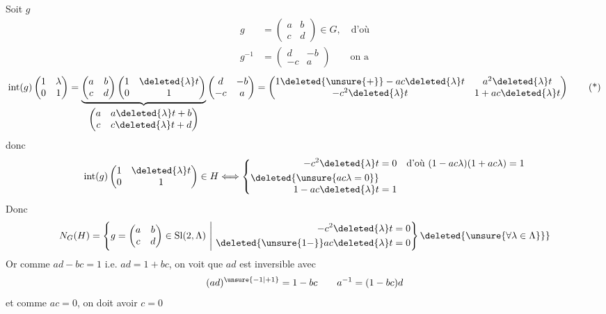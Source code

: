 Soit $g$
\[
\begin{aligned}
g&=\begin{pmatrix}a&b\\c&d\end{pmatrix}\in G,\quad\text{d'où}\\
g^{-1}&=\begin{pmatrix}d&-b\\-c&a\end{pmatrix}\qquad\text{on a}
\end{aligned}
\]
\[
\operatorname{int}(g)\begin{pmatrix}1&\lambda\\0&1\end{pmatrix}=
\underbrace{\begin{pmatrix}a&b\\c&d\end{pmatrix}\begin{pmatrix}1&\deleted{\lambda}t\\0&1\end{pmatrix}}_{\begin{pmatrix}a&a\deleted{\lambda}t+b\\c&c\deleted{\lambda}t+d\end{pmatrix}}
\begin{pmatrix}d&-b\\-c&a\end{pmatrix}=
\begin{pmatrix}1\deleted{\unsure{+}}-ac\deleted{\lambda}t&a^2\deleted{\lambda}t\\-c^2\deleted{\lambda}t&1+ac\deleted{\lambda}t\end{pmatrix}\tag*{(*)}
\]
donc
\[
\operatorname{int}(g)\begin{pmatrix}1&\deleted{\lambda}t\\0&1\end{pmatrix}\in H
\Longleftrightarrow\left\{\begin{aligned}
-c^2\deleted{\lambda}t&=0\quad\text{d'où }(1-ac\lambda)(1+ac\lambda)=1\\
\deleted{\unsure{ac\lambda=0}}\\[-3pt]
1-ac\deleted{\lambda}t&=1
\end{aligned}\right.
\]
Donc
\[
N_G(H)=\left\{g=\begin{pmatrix}a&b\\c&d\end{pmatrix}\in\mathrm{Sl}(2,\Lambda)\ \middle|\ 
\begin{aligned}-c^2\deleted{\lambda}t&=0\\
\deleted{\unsure{1-}}ac\deleted{\lambda}t&=0\end{aligned}\right\}
\deleted{\unsure{\forall\lambda\in\Lambda\}}}
\]
Or 
comme $ad-bc=1$ i.e. $ad=1+bc$, on voit
que  $ad$ est inversible  avec
\[
(ad)^{\unsure{-1|+1}}=1-bc\qquad a^{-1}=(1-bc)d
\]
et comme $ac=0$, on doit avoir $c=0$

